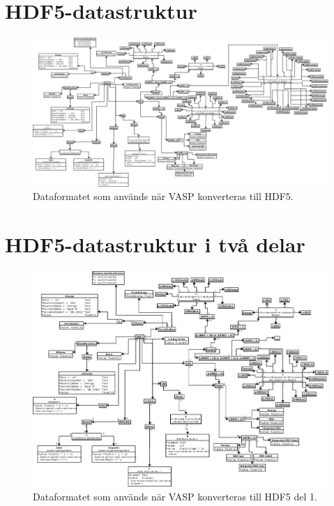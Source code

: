 \documentclass[a4paper,12pt]{article}
\begin{document}
\begin{appendices}

\section{HDF5-datastruktur}
\label{appendix:hdf5-format}
\begin{figure}[H]
    \centering
    \includegraphics[scale=0.28,angle=-90,origin=c]{hdf5-dataformat3modi.png}
    \caption{Dataformatet som används när VASP konverteras till HDF5.}
    \label{fig:hdf5-dataformat-roterad}
\end{figure}

\section{HDF5-datastruktur i två delar}
\label{appendix:hdf5-format2}
\begin{figure}[H]
    \centering
    \includegraphics[scale=0.40,angle=-90,origin=c]{hdf5-dataformat3del1modi.png}
    \caption{Dataformatet som används när VASP konverteras till HDF5 del 1.}
\end{figure}


\end{appendices}
\end{document}
